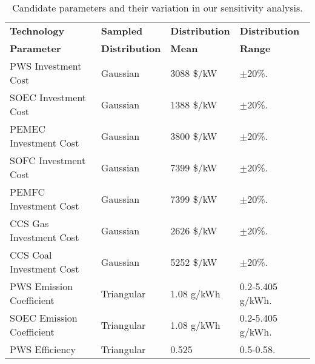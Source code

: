 \begin{table}[!ht]
	\caption{Candidate parameters and their variation in our sensitivity analysis.}
	\vspace{0.1in}
	\begin{tabularx}{0.9\textwidth}{p{} p{} p{}p{}}
\hline 
\textbf{Technology}  & \textbf{Sampled} & \textbf{Distribution}& \textbf{Distribution}\\
\textbf{Parameter} & \textbf{Distribution} & \textbf{Mean}& \textbf{Range}\\
\hline
\gls{PWS} Investment Cost       & Gaussian    & 3088 \$/kW & $\pm$20\%. \\                  
\gls{SOEC} Investment Cost      & Gaussian    & 1388 \$/kW & $\pm$20\%.\\                  
\gls{PEMEC} Investment Cost     & Gaussian    & 3800 \$/kW & $\pm$20\%.\\                  
\gls{SOFC} Investment Cost      & Gaussian    & 7399 \$/kW & $\pm$20\%.\\                  
\gls{PEMFC} Investment Cost     & Gaussian    & 7399 \$/kW & $\pm$20\%.\\                  
\gls{CCS} Gas Investment Cost   & Gaussian    & 2626 \$/kW & $\pm$20\%.\\                  
\gls{CCS} Coal Investment Cost  & Gaussian    & 5252 \$/kW & $\pm$20\%.\\
\gls{PWS} Emission Coefficient  & Triangular  & 1.08 g/kWh & 0.2-5.405 g/kWh. \\                  
\gls{SOEC} Emission Coefficient & Triangular  & 1.08 g/kWh & 0.2-5.405 g/kWh. \\
\gls{PWS} Efficiency            & Triangular  & 0.525 & 0.5-0.58. \\                               
\hline
	\end{tabularx}
\label{sa-vars}
\end{table}